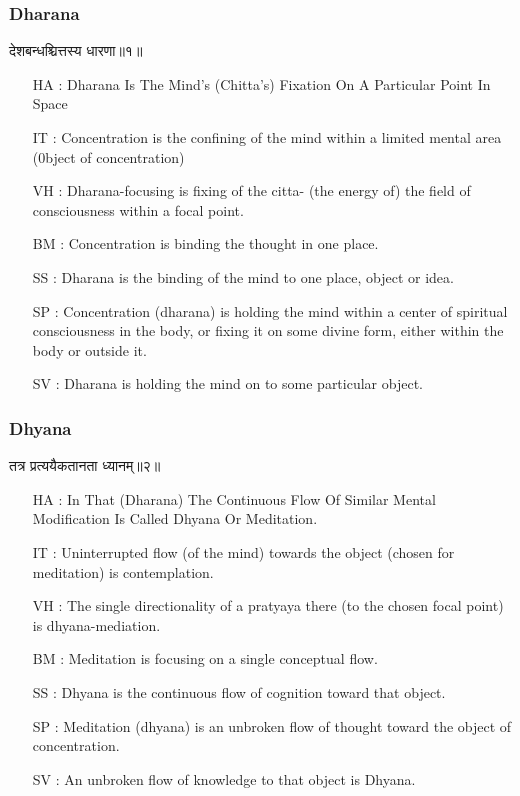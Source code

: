 \begin{frame}[fragile]\frametitle{Dharana}
\begin{sanskrit}
देशबन्धश्चित्तस्य धारणा॥१॥
\end{sanskrit}

	\begin{itemize}
	\item [HA]: Dharana Is The Mind’s (Chitta’s) Fixation On A Particular Point In Space
	\item [IT]: Concentration is the confining of the mind within a limited mental area (0bject of concentration)
	\item [VH]: Dharana-focusing is fixing of the citta- (the energy of) the field of consciousness within a focal point.
	\item [BM]: Concentration is binding the thought in one place.
	\item [SS]: Dharana is the binding of the mind to one place, object or idea.
	\item [SP]: Concentration (dharana) is holding the mind within a center of spiritual consciousness in the body, or fixing it on some divine form, either within the body or outside it.
	\item [SV]: Dharana is holding the mind on to some particular object. 
	\end{itemize}
\end{frame}

\begin{frame}[fragile]\frametitle{Dhyana}
\begin{sanskrit}
तत्र प्रत्ययैकतानता ध्यानम्॥२॥
\end{sanskrit}

	\begin{itemize}
	\item [HA]: In That (Dharana) The Continuous Flow Of Similar Mental Modification Is Called Dhyana Or Meditation.
	\item [IT]: Uninterrupted flow (of the mind) towards the object (chosen for meditation) is contemplation.
	\item [VH]: The single directionality of a pratyaya there (to the chosen focal point) is dhyana-mediation.
	\item [BM]: Meditation is focusing on a single conceptual flow.
	\item [SS]: Dhyana is the continuous flow of cognition toward that object.
	\item [SP]: Meditation (dhyana) is an unbroken flow of thought toward the object of concentration.
	\item [SV]: An unbroken flow of knowledge to that object is Dhyana. 
	\end{itemize}
\end{frame}



